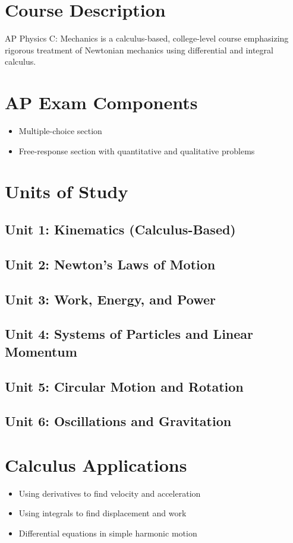 \documentclass[12pt,oneside]{book}
\begin{document}
\section{Course Description}
AP Physics C: Mechanics is a calculus-based, college-level course emphasizing rigorous
treatment of Newtonian mechanics using differential and integral calculus.

\section{AP Exam Components}
\begin{itemize}[leftmargin=2em]
    \item Multiple-choice section
    \item Free-response section with quantitative and qualitative problems
\end{itemize}

\section{Units of Study}
\subsection*{Unit 1: Kinematics (Calculus-Based)}
\subsection*{Unit 2: Newton's Laws of Motion}
\subsection*{Unit 3: Work, Energy, and Power}
\subsection*{Unit 4: Systems of Particles and Linear Momentum}
\subsection*{Unit 5: Circular Motion and Rotation}
\subsection*{Unit 6: Oscillations and Gravitation}

\section{Calculus Applications}
\begin{itemize}[leftmargin=2em]
    \item Using derivatives to find velocity and acceleration
    \item Using integrals to find displacement and work
    \item Differential equations in simple harmonic motion
\end{itemize}
\end{document}
